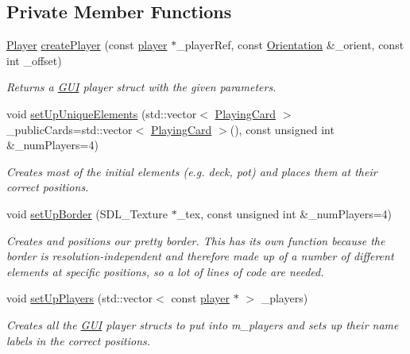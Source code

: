 \subsection*{Private Member Functions}
\begin{DoxyCompactItemize}
\item 
\hyperlink{structGUI_1_1Player}{Player} \hyperlink{classGUI_1_1DealerGUI_a6ea2f743642751e1eb98fec9ebb4f8c0}{create\-Player} (const \hyperlink{classplayer}{player} $\ast$\-\_\-player\-Ref, const \hyperlink{namespaceGUI_a1a3a8094d47f7be06ce123fab38abf6a}{Orientation} \&\-\_\-orient, const int \-\_\-offset)
\begin{DoxyCompactList}\small\item\em Returns a \hyperlink{namespaceGUI}{G\-U\-I} player struct with the given parameters. \end{DoxyCompactList}\item 
void \hyperlink{classGUI_1_1DealerGUI_a34e6c9803aace17c7464fac4e4e30ef5}{set\-Up\-Unique\-Elements} (std\-::vector$<$ \hyperlink{classPlayingCard}{Playing\-Card} $>$ \-\_\-public\-Cards=std\-::vector$<$ \hyperlink{classPlayingCard}{Playing\-Card} $>$(), const unsigned int \&\-\_\-num\-Players=4)
\begin{DoxyCompactList}\small\item\em Creates most of the initial elements (e.\-g. deck, pot) and places them at their correct positions. \end{DoxyCompactList}\item 
void \hyperlink{classGUI_1_1DealerGUI_a4944cae17d869ee0b264661c2a3f4c9c}{set\-Up\-Border} (S\-D\-L\-\_\-\-Texture $\ast$\-\_\-tex, const unsigned int \&\-\_\-num\-Players=4)
\begin{DoxyCompactList}\small\item\em Creates and positions our pretty border. This has its own function because the border is resolution-\/independent and therefore made up of a number of different elements at specific positions, so a lot of lines of code are needed. \end{DoxyCompactList}\item 
void \hyperlink{classGUI_1_1DealerGUI_a3ed42e5088996a09356296adf91dbf5d}{set\-Up\-Players} (std\-::vector$<$ const \hyperlink{classplayer}{player} $\ast$ $>$ \-\_\-players)
\begin{DoxyCompactList}\small\item\em Creates all the \hyperlink{namespaceGUI}{G\-U\-I} player structs to put into m\-\_\-players and sets up their name labels in the correct positions. \end{DoxyCompactList}\item 

\end{DoxyCompactItemize}
